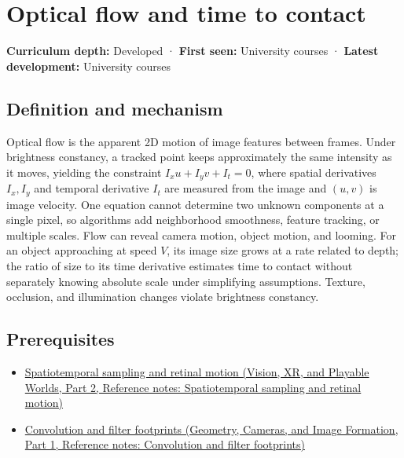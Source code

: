 \hypertarget{appendix-e2e73f8cd93e}{}\label{referencestart:appendix-e2e73f8cd93e}
\section{Optical flow and time to contact}\label{appendix-e2e73f8cd93e-optical-flow-and-time-to-contact}

\hypertarget{appendix-e2e73f8cd93e-optical-flow-and-time-to-contact}{}

\textbf{Curriculum depth:} Developed · \textbf{First seen:} University courses · \textbf{Latest development:} University courses

\begin{allmightroledefinition}

\subsection{Definition and mechanism}\label{appendix-e2e73f8cd93e-definition-and-mechanism}

\hypertarget{appendix-e2e73f8cd93e-definition-and-mechanism}{}

Optical flow is the apparent 2D motion of image features between frames. Under brightness constancy, a tracked point keeps approximately the same intensity as it moves, yielding the constraint \(I_xu+I_yv+I_t=0\), where spatial derivatives \(I_x,I_y\) and temporal derivative \(I_t\) are measured from the image and \((u,v)\) is image velocity. One equation cannot determine two unknown components at a single pixel, so algorithms add neighborhood smoothness, feature tracking, or multiple scales. Flow can reveal camera motion, object motion, and looming. For an object approaching at speed \(V\), its image size grows at a rate related to depth; the ratio of size to its time derivative estimates time to contact without separately knowing absolute scale under simplifying assumptions. Texture, occlusion, and illumination changes violate brightness constancy.

\end{allmightroledefinition}

\subsection{Prerequisites}\label{appendix-e2e73f8cd93e-prerequisites}

\hypertarget{appendix-e2e73f8cd93e-prerequisites}{}

\begin{itemize}
\tightlist
\item
  \href{../07-Vision-XR-and-Playable-Worlds-P02/main.pdf\#appendix-70895739febb}{Spatiotemporal sampling and retinal motion (Vision, XR, and Playable Worlds, Part 2, Reference notes: Spatiotemporal sampling and retinal motion)}
\item
  \href{../03-Geometry-Cameras-and-Image-Formation-P01/main.pdf\#appendix-d5b3c692d9f0}{Convolution and filter footprints (Geometry, Cameras, and Image Formation, Part 1, Reference notes: Convolution and filter footprints)}
\end{itemize}

